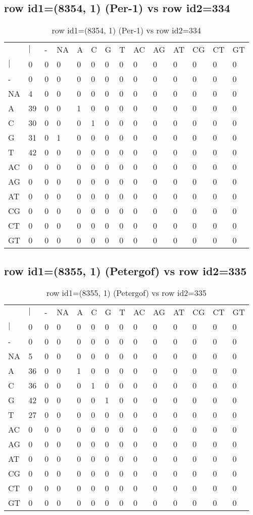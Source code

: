 \subsection{row id1=(8354, 1) (Per-1) vs row id2=334}
\begin{center}
\begin{longtable}{|l|l|l|l|l|l|l|l|l|l|l|l|l|l|}
\caption{row id1=(8354, 1) (Per-1) vs row id2=334} \label{table_dm568}\\
\hline
\\
\hline
&$|$&-&NA&A&C&G&T&AC&AG&AT&CG&CT&GT\\
$|$&0&0&0&0&0&0&0&0&0&0&0&0&0\\
-&0&0&0&0&0&0&0&0&0&0&0&0&0\\
NA&4&0&0&0&0&0&0&0&0&0&0&0&0\\
A&39&0&0&1&0&0&0&0&0&0&0&0&0\\
C&30&0&0&0&1&0&0&0&0&0&0&0&0\\
G&31&0&1&0&0&0&0&0&0&0&0&0&0\\
T&42&0&0&0&0&0&0&0&0&0&0&0&0\\
AC&0&0&0&0&0&0&0&0&0&0&0&0&0\\
AG&0&0&0&0&0&0&0&0&0&0&0&0&0\\
AT&0&0&0&0&0&0&0&0&0&0&0&0&0\\
CG&0&0&0&0&0&0&0&0&0&0&0&0&0\\
CT&0&0&0&0&0&0&0&0&0&0&0&0&0\\
GT&0&0&0&0&0&0&0&0&0&0&0&0&0\\
\hline
\end{longtable}
\end{center}

\subsection{row id1=(8355, 1) (Petergof) vs row id2=335}
\begin{center}
\begin{longtable}{|l|l|l|l|l|l|l|l|l|l|l|l|l|l|}
\caption{row id1=(8355, 1) (Petergof) vs row id2=335} \label{table_dm570}\\
\hline
\\
\hline
&$|$&-&NA&A&C&G&T&AC&AG&AT&CG&CT&GT\\
$|$&0&0&0&0&0&0&0&0&0&0&0&0&0\\
-&0&0&0&0&0&0&0&0&0&0&0&0&0\\
NA&5&0&0&0&0&0&0&0&0&0&0&0&0\\
A&36&0&0&1&0&0&0&0&0&0&0&0&0\\
C&36&0&0&0&1&0&0&0&0&0&0&0&0\\
G&42&0&0&0&0&1&0&0&0&0&0&0&0\\
T&27&0&0&0&0&0&0&0&0&0&0&0&0\\
AC&0&0&0&0&0&0&0&0&0&0&0&0&0\\
AG&0&0&0&0&0&0&0&0&0&0&0&0&0\\
AT&0&0&0&0&0&0&0&0&0&0&0&0&0\\
CG&0&0&0&0&0&0&0&0&0&0&0&0&0\\
CT&0&0&0&0&0&0&0&0&0&0&0&0&0\\
GT&0&0&0&0&0&0&0&0&0&0&0&0&0\\
\hline
\end{longtable}
\end{center}

